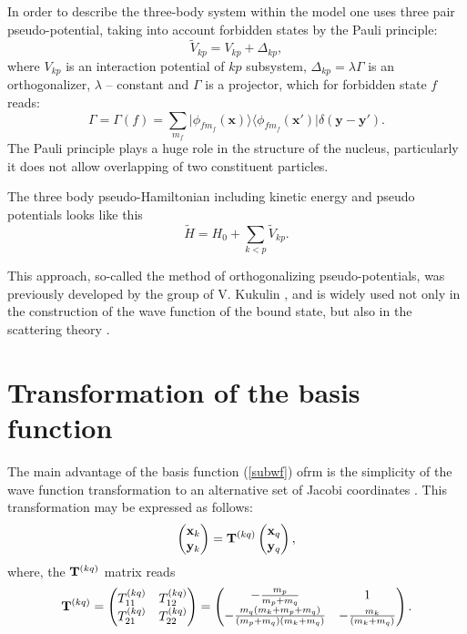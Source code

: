 \documentclass[
12pt, %
oneside, %
english, %
onehalfspacing, %
onehalfspacing, %
headsepline, %
]{MastersDoctoralThesis} %
\begin{document}
In order  to describe the three-body system within the model \cite{kukulin1977stochastic} one uses three pair pseudo-potential, taking into account forbidden states by the Pauli principle:
\begin{equation}
\label{pseudopot}
\widetilde{V}_{kp}=V_{kp}+\Delta_{kp},
\end{equation}
where $V_{kp}$ is  an interaction potential of $kp$ subsystem, $\Delta_{kp}=\lambda \Gamma$ is an orthogonalizer, $\lambda$ -- constant and $\Gamma$ is a projector, which  for  forbidden state $f$ reads:
\begin{equation}
\label{projector}
\Gamma=\Gamma(f)=\sum\limits_{m_f}\vert \phi_{fm_f} ({\mathbf x})\rangle \langle  \phi_{fm_f} ({\mathbf x'}) \vert \delta({\mathbf y - \mathbf y'}).
\end{equation}
The Pauli principle plays a huge role in the structure of the nucleus, particularly it does not allow overlapping of two constituent particles. 

The three body pseudo-Hamiltonian including kinetic energy and pseudo potentials looks like this
\begin{equation}
\label{pseudohamiltonian}
\widetilde{H}=H_0+\sum_{k < p} \widetilde{V }_{kp}.
\end{equation}

This approach, so-called the method of orthogonalizing pseudo-potentials, was previously developed by the group of V. Kukulin \cite{kukulin1978orthogonal}, and is widely used not only in the construction of the wave function of the bound state, but also in the scattering theory \cite{blokhintsev1993determination, tursunov2016theoretical}.

 \section{Transformation of the basis function }
The main advantage of the basis function  (\ref{subwf}) ofrm is the simplicity of the wave function transformation to an alternative set of Jacobi coordinates \cite{suzuki1998stochastic}.
This transformation may be expressed as follows:
\begin{equation}
\begin{pmatrix}
{\bf x}_k \\ 
{\bf y}_k
\end{pmatrix}  = {\bf T}^{(kq)}
\begin{pmatrix}
{\bf x}_q \\ 
{\bf y}_q
\end{pmatrix},
\end{equation}
where, the ${\bf T}^{(kq)}$ matrix reads  
\begin{equation}
{\bf T}^{(kq)} = 
 \begin{pmatrix}
 { T}^{(kq)}_{11} & { T}^{(kq)}_{12} \\
 { T}^{(kq)}_{21}  &  { T}^{(kq)}_{22}
 \end{pmatrix}
=
 \begin{pmatrix}
 -\tfrac{m_p}{m_p+m_q} & 1 \\
 -\tfrac{m_q(m_k+m_p+m_q)}{(m_p+m_q)(m_k+m_q)}  &  -\tfrac{m_k}{(m_k+m_q)}
 \end{pmatrix}.
\end{equation}
\end{document}
